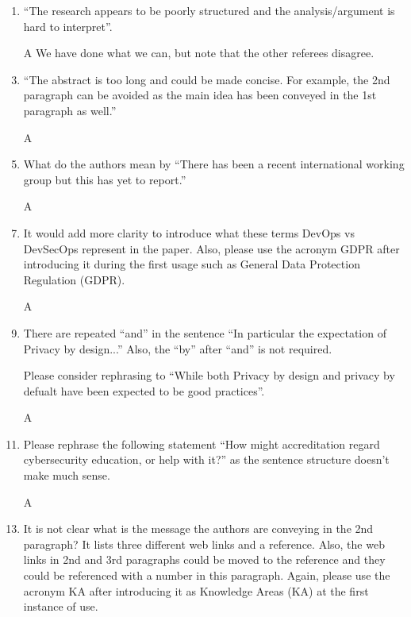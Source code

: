 \documentclass{article}
\begin{document}
\begin{enumerate}
\item ``The research appears to be poorly structured and the analysis/argument is hard to interpret''.
\item[A]We have done what we can, but note that the other referees disagree.
\item ``The abstract is too long and could be made concise. For example, the 2nd paragraph can be avoided as the main idea has been conveyed in the 1st paragraph as well.''
\item[A]
\item What do the authors mean by ``There has been a recent international working group but this has yet to report.'' 
\item[A]
\item It would add more clarity to introduce what these terms DevOps vs DevSecOps represent in the paper. Also, please use the acronym GDPR after introducing it during the first usage such as General Data Protection Regulation (GDPR). 
\item[A]
\item There are repeated ``and'' in the sentence ``In particular the expectation of Privacy by design...'' Also, the ``by'' after ``and'' is not required. 

Please consider rephrasing to ``While both Privacy by design and privacy by defualt have been expected to be good practices''.

\item[A]
\item Please rephrase the following statement ``How might accreditation regard cybersecurity education, or help with it?'' as the sentence structure doesn't make much sense. 
\item[A]
\item It is not clear what is the message the authors are conveying in the 2nd paragraph? It lists three different web links and a reference. Also, the web links in 2nd and 3rd paragraphs could be moved to the reference and they could be referenced with a number in this paragraph. 
Again, please use the acronym KA after introducing it as Knowledge Areas (KA) at the first instance of use. 



\end{enumerate}
\end{document}

